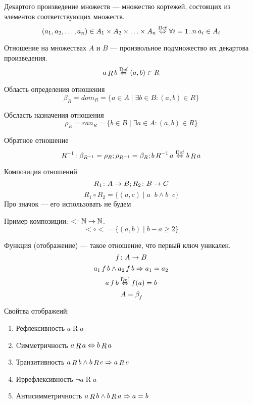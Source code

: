 \begin{Def}
Декартого произведение множеств --- множество кортежей, состоящих из элементов соответствующих множеств.
$$ \left(a_1, a_2, \ldots, a_n\right) \in A_1 \times A_2 \times \ldots \times A_n \stackrel{\mathrm{Def}}{\Leftrightarrow} \forall i=1..n\: a_i \in A_i $$
\end{Def}
\begin{Def}
Отношение на множествах $A$ и $B$ --- произвольное подмножество их декартова произведения.
$$ a \mathop{R} b \stackrel{\mathrm{Def}}{\Leftrightarrow} (a, b) \in R $$
\end{Def}
\begin{Def}
Область определения отношения 
$$ \beta_R = dom_R = \{a \in A \mid \exists b \in B\colon (a,b) \in R\} $$
\end{Def}
\begin{Def}
Обсласть назначения отношения 
$$ \rho_R = ran_R =\{b \in B \mid \exists a \in A\colon (a, b) \in R\}$$
\end{Def}
\begin{Def}
Обратное отношение
$$R^{-1} \colon \beta_{R^{-1}} = \rho_R; \rho_{R^{-1}} = \beta_R; b \mathop{R^{-1}} a \stackrel{\mathrm{Def}}{\Leftrightarrow} b \mathop{R} a$$
\end{Def}
\begin{Def}
Композиция отношений
$$ R_1\colon A \rightarrow B; R_2\colon B \rightarrow C $$
$$ R_1 \circ R_2 = \{(a, c) \mid a \mathop{R_1} b \land b \mathop{R_2} c\} $$
Про значок --- его использовать не будем
\end{Def}

Пример композиции: $<\colon \mathbb{N} \rightarrow \mathbb{N}$. $$< \circ < = \{(a, b) \mid b - a \geqslant 2\}$$

\begin{Def}
Функция (отображение) --- такое отношение, что первый ключ уникален.
$$f\colon A \rightarrow B$$
$$ a_1 \mathop{f} b \land a_2 \mathop{f} b \Rightarrow a_1 = a_2 $$
$$ a \mathop{f} b \stackrel{\mathrm{Def}}{\Leftrightarrow} f(a) = b $$
$$ A = \beta_f$$
\end{Def}

\begin{Def}Свойтва отображеий:
\begin{enumerate}
\item Рефлексивность $a \mathop{R} a$
\item Cимметричность $a \mathop{R} a \Leftrightarrow b \mathop{R} a$
\item Транзитивность $a \mathop{R} b \land b \mathop{R} c \Rightarrow a \mathop{R} c$
\item Иррефлексивность $\lnot a \mathop{R} a$
\item Антисимметричность $a \mathop{R} b \land b \mathop{R} a \Rightarrow a = b$
\end{enumerate}
\end{Def}


